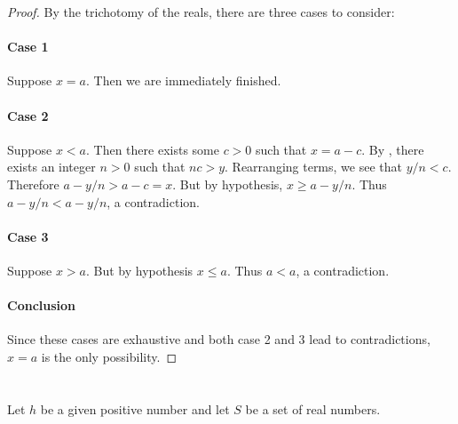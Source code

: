 \documentclass{report}
\begin{document}
  \begin{proof}

    By the trichotomy of the reals, there are three cases to consider:

    \paragraph{Case 1}%

      Suppose $x = a$.
      Then we are immediately finished.

    \paragraph{Case 2}%

      Suppose $x < a$.
      Then there exists some $c > 0$ such that $x = a - c$.
      By , there exists an integer
        $n > 0$ such that $nc > y$.
      Rearranging terms, we see that $y / n < c$.
      Therefore $a - y / n > a - c = x$.
      But by hypothesis, $x \geq a - y / n$.
      Thus $a - y / n < a - y / n$, a contradiction.

    \paragraph{Case 3}%

      Suppose $x > a$.
      But by hypothesis $x \leq a$.
      Thus $a < a$, a contradiction.

    \paragraph{Conclusion}%

      Since these cases are exhaustive and both case 2 and 3 lead to
        contradictions, $x = a$ is the only possibility.

  \end{proof}

\section{}%

  Let $h$ be a given positive number and let $S$ be a set of real numbers.

\subsection{}%
\end{document}
